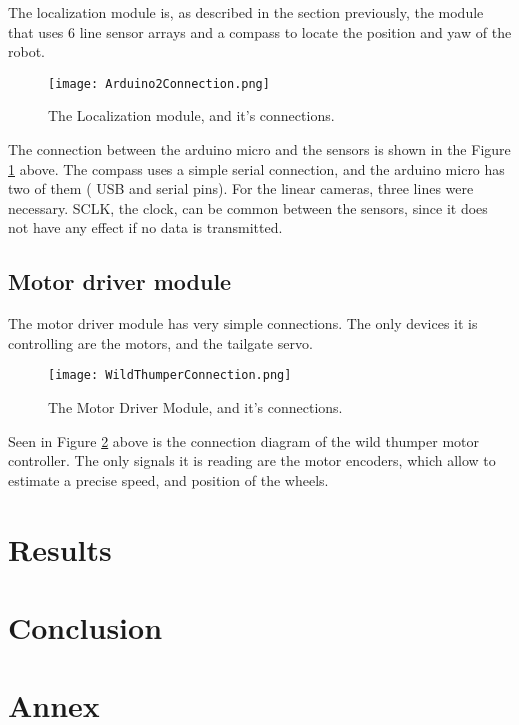 The localization module is, as described in the section previously, the module that uses 6 line sensor arrays and a compass to locate the position and yaw of the robot. 

\begin{figure}[H]
  \centering
  \texttt{[image: Arduino2Connection.png]}
  \caption{The Localization module, and it's connections.}
\label{fig:ard2connection}
\end{figure}

The connection between the arduino micro and the sensors is shown in the Figure \ref{fig:ard2connection} above. The compass uses a simple serial connection, and the arduino micro has two of them ( USB and serial pins). For the linear cameras, three lines were necessary. SCLK, the clock, can be common between the sensors, since it does not have any effect if no data is transmitted. %

\section{Motor driver module}

The motor driver module has very simple connections. The only devices it is controlling are the motors, and the tailgate servo.

\begin{figure}[H]
  \centering
  \texttt{[image: WildThumperConnection.png]}
  \caption{The Motor Driver Module, and it's connections.}
\label{fig:wtconnection}
\end{figure}

Seen in Figure \ref{fig:wtconnection} above is the connection diagram of the wild thumper motor controller. The only signals it is reading are the motor encoders, which allow to estimate a precise speed, and position of the wheels.


\chapter{Results}

\chapter{Conclusion}

\chapter{Annex}

